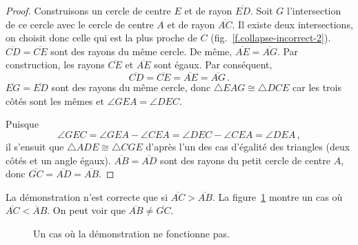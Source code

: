 \begin{proof}
Construisons un cercle de centre $E$ et de rayon $\overline{ED}$. Soit $G$ l'intersection de ce cercle avec le cercle de centre $A$ et de rayon $\overline{AC}$. Il existe deux intersections, on choisit donc celle qui est la plus proche de $C$ (fig.~\ref{f.collapse-incorrect-2}).
$\overline{CD}=\overline{CE}$ sont des rayons du même cercle. De même,  $\overline{AE}=\overline{AG}$. Par construction, les rayons $\overline{CE}$ et $\overline{AE}$ sont égaux. Par conséquent,
\[
\overline{CD} = \overline{CE} = \overline{AE} = \overline{AG}\,.
\]
$\overline{EG} = \overline{ED}$ sont des rayons du même cercle, donc $\triangle EAG\cong \triangle DCE$ car les trois côtés sont les mêmes et $\angle GEA = \angle DEC$.



Puisque
\[
\angle GEC = \angle GEA \!-\!\angle CEA = \angle DEC\!-\!\angle CEA = \angle DEA\,,
\] 
il s'ensuit que $\triangle ADE\cong\triangle CGE$ d'après l'un des cas d'égalité des triangles (deux côtés et un angle égaux). $\overline{AB}=\overline{AD}$ sont des rayons du petit cercle de  centre  $A$, donc $\overline{GC}=\overline{AD}=\overline{AB}$.
\end{proof}

La démonstration n'est correcte que si $\overline{AC}>\overline{AB}$.  La figure~\ref{f.collapse-incorrect-4} montre un cas où $\overline{AC}<\overline{A}B$. On peut voir que $\overline{AB}\neq\overline{GC}$.

\begin{figure}[htbp]
\centering
{}
     \caption{Un cas où la démonstration ne fonctionne pas.}
     \label{f.collapse-incorrect-4}
\end{figure}



